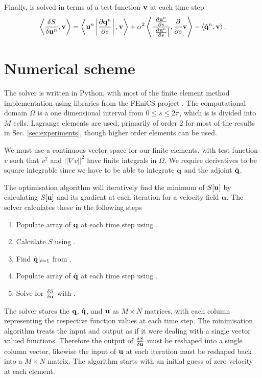 \documentclass[a4paper, 12pt]{article}
\begin{document}
Finally,  is solved in terms of a test function $\mathbf{v}$ at
each time step
\begin{equation}
  \label{eq:dSdu}
  \left\langle \frac{\delta S}{\delta \mathbf{u}^n}, \mathbf{v} \right\rangle = 
  \left\langle \mathbf{u}^n \left|\frac{\partial \mathbf{q}^n}{\partial s}\right|, \mathbf{v} \right\rangle 
  + \alpha^2 \left\langle \frac{\frac{\partial \mathbf{u}^n}{\partial s}}{\left|\frac{\partial \mathbf{u}^n}{\partial s}\right|},
    \frac{\partial }{\partial s}\mathbf{v} \right\rangle
  - \left\langle \hat{\mathbf{q}}^n,\mathbf{v} \right\rangle.
\end{equation}

\section{Numerical scheme\label{sec:implementation}}

The solver is written in Python, with most of the finite element method
implementation using libraries from the FEniCS project
\cite{logg2007fenics}. The computational domain $\Omega$ is a one dimensional
interval from $0 \leq s \leq 2\pi$, which is is divided into $M$
cells. Lagrange elements are used, primarily of order 2 for most of the
results in Sec. \ref{sec:experiments}, though higher order elements can be used.

We must use a continuous vector space for our finite elements, with test function $v$
such that $v^2$ and $||\nabla v||^2$ have finite integrals in $\Omega$. We
require derivatives to be square integrable since we have to be able to
integrate $\mathbf{q}$ and the adjoint $\hat{\mathbf{q}}$.


The optimisation algorithm will iteratively find the minimum of $S[\mathbf{u}]$ by calculating
$S[\mathbf{u}]$ and its gradient at each iteration for a velocity field $\mathbf{u}$. The
solver calculates these in the following steps
\begin{enumerate}
\item Populate array of $\mathbf{q}$ at each time step using .
\item Calculate $S$ using .
\item Find $\hat{\mathbf{q}}|_{t=1}$ from .
\item Populate array of $\hat{\mathbf{q}}$ at each time step using .
\item Solve for $\frac{\delta S}{\delta \mathbf{u}}$ with .
\end{enumerate}

The solver stores the $\mathbf{q}$, $\hat{\mathbf{q}}$, and $\mathbf{u}$ as $M\times N$
matrices, with each column representing the respective function values at each
time step. The minimisation algorithm treats the input and output as if it were
dealing with a single vector valued functions. Therefore the output of
$\frac{\delta S}{\delta \mathbf{u}}$ must be reshaped into a single column vector, likewise the
input of $\mathbf{u}$ at each iteration must be reshaped back into a $M\times N$
matrix. The algorithm starts with an initial guess of zero velocity at each
element.
\end{document}
